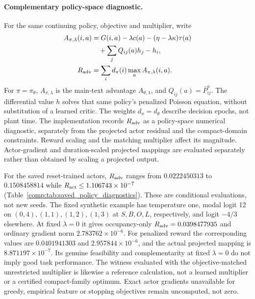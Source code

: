\documentclass[11pt]{article}
\newcommand{\1}{\mathbf{1}}
\begin{document}
\paragraph{Complementary policy-space diagnostic.}
For the same continuing policy, objective and multiplier, write
\[
 \begin{aligned}
 A_{\pi,\lambda}(i,a)&=G(i,a)-\lambda c(a)-(\eta-\lambda\kappa)\tau(a)\\
 &\quad+\sum_j Q_{ij}(a)h_j-h_i,\\
 R_{\rm adv}&=\sum_i d_\pi(i)\max_a A_{\pi,\lambda}(i,a).
 \end{aligned}
\]
For $\pi=\pi_\theta$, $A_{\pi,\lambda}$ is the main-text advantage $A_{\theta,\lambda}$, and $Q_{ij}(a)=\bar P^a_{ij}$. The differential value $h$ solves that same policy's penalized Poisson equation, without substitution of a learned critic. The weights $d_\pi=d_\theta$ describe decision epochs, not plant time. The implementation records $R_{\rm adv}$ as a policy-space numerical diagnostic, separately from the projected actor residual and the compact-domain constraints. Reward scaling and the matching multiplier affect its magnitude. Actor-gradient and duration-scaled projected mappings are evaluated separately rather than obtained by scaling a projected output.

For the saved reset-trained actors, $R_{\rm adv}$ ranges from $0.0222450313$ to $0.1508458814$ while $R_{\rm act}\le1.106743\times10^{-7}$ (Table~\ref{comp:tab:saved_policy_diagnostics}). These are conditional evaluations, not new seeds. The fixed synthetic example has temperature one, modal logit 12 on $(0,4),(1,1),(1,2),(1,3)$ at $S,B,O,L$, respectively, and logit $-4/3$ elsewhere. At fixed $\lambda=0$ it gives occupancy-only $R_{\rm adv}=0.0398477935$ and ordinary gradient norm $2.783762\times10^{-6}$. For penalized reward the corresponding values are $0.0401941303$ and $2.957844\times10^{-6}$, and the actual projected mapping is $8.871197\times10^{-7}$. Its genuine feasibility and complementarity at fixed $\lambda=0$ do not imply good task performance. The witness evaluated with the objective-matched unrestricted multiplier is likewise a reference calculation, not a learned multiplier or a certified compact-family optimum. Exact actor gradients unavailable for greedy, empirical feature or stopping objectives remain uncomputed, not zero.
\end{document}
